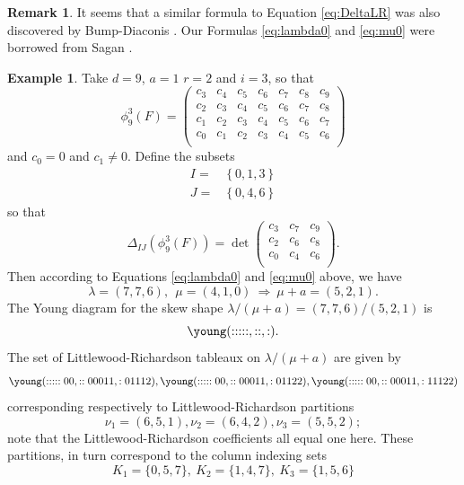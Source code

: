 \documentclass[unnumsec,webpdf,modern,medium]{oup-authoring-template}
\theoremstyle{theorem}
\theoremstyle{definition}
\newtheorem{remark}[theorem]{Remark}
\newtheorem{example}[theorem]{Example}
\begin{document}
\begin{remark}
	\label{rem:BD}
	It seems that a similar formula to Equation \eqref{eq:DeltaLR} was also discovered by Bump-Diaconis \cite[Lemma page 261]{BD}.  %
	Our Formulas \eqref{eq:lambda0} and \eqref{eq:mu0} were borrowed from Sagan \cite[Theorem 6.3]{Sagan}.
\end{remark}

\begin{example}
	Take $d=9$, $a=1$ $r=2$ and $i=3$, so that 
	$$\phi^3_9(F)=\left(\begin{array}{ccccccc}
		c_3 & c_4 & c_5 & c_6 & c_7 & c_8 & c_9\\
		c_2 & c_3 & c_4 & c_5 & c_6 & c_7 & c_8\\
		c_1 & c_2 & c_3 & c_4 & c_5 & c_6 & c_7\\
		c_0 & c_1 & c_2 & c_3 & c_4 & c_5 & c_6\\
	\end{array}\right)$$
	and $c_0=0$ and $c_1\neq 0$.
	Define the subsets 
	\begin{align*}
		I= & \left\{0, 1, 3\right\}\\
		J= & \left\{0, 4, 6\right\}
	\end{align*}
	so that 
	$$\Delta_{IJ}\left(\phi^3_9(F)\right)=\det\left(\begin{array}{ccc}
		c_3 & c_7 & c_9\\
		c_2 & c_6 & c_8\\
		c_0 & c_4 & c_6\\
	\end{array}\right).$$
	Then according to Equations \eqref{eq:lambda0} and \eqref{eq:mu0} above, we have
	$$\lambda=(7, 7, 6), \ \ \mu=(4, 1,0) \ \Rightarrow \ \mu+a=(5,2,1).$$
	The Young diagram for the skew shape $\lambda/(\mu+a)=(7,7,6)/(5,2,1)$ is 
	$$\young(:::::\hfil \hfil ,::\hfil \hfil \hfil \hfil \hfil,:\hfil \hfil \hfil \hfil \hfil).$$
	The set of Littlewood-Richardson tableaux on $\lambda/(\mu+a)$ are given by 
	$$\young(:::::00,::00011,:01112), \young(:::::00,::00011,:01122), \young(:::::00,::00011,:11122)$$
	corresponding respectively to Littlewood-Richardson partitions
	$$\nu_1=(6,5,1), \nu_2=(6,4,2), \nu_3=(5,5,2);$$
	note that the Littlewood-Richardson coefficients all equal one here.
	These partitions, in turn correspond to the column indexing sets
	$$K_1=\{0, 5, 7\}, \ K_2=\{1, 4, 7\}, \ K_3=\{1, 5, 6\}$$

\end{example}
\end{document}
